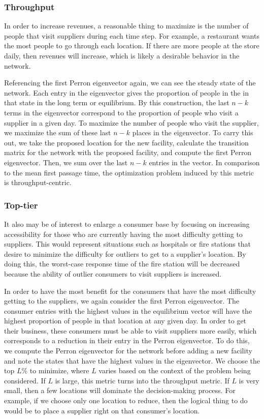 \documentclass[twoside,twocolumn]{article}
\begin{document}
\subsubsection{Throughput}

In order to increase revenues, a reasonable thing to maximize is the number of people that visit suppliers during each time step.
For example, a restaurant wants the most people to go through each location.
If there are more people at the store daily, then revenues will increase, which is likely a desirable behavior in the network.

Referencing the first Perron eigenvector again, we can see the steady state of the network. 
Each entry in the eigenvector gives the proportion of people in the in that state in the long term or equilibrium. 
By this construction, the last $n - k$ terms in the eigenvector correspond to the proportion of people who visit a supplier in a given day.
To maximize the number of people who visit the supplier, we maximize the sum of these last $n - k$ places in the eigenvector.
To carry this out, we take the proposed location for the new facility, calculate the transition matrix for the network with the proposed facility, and compute the first Perron eigenvector.
Then, we sum over the last $n - k$ entries in the vector.
In comparison to the mean first passage time, the optimization problem induced by this metric is throughput-centric.

\subsubsection{Top-tier}
It also may be of interest to enlarge a consumer base by focusing on increasing accessibility for those who are currently having the most difficulty getting to suppliers.
This would represent situations such as hospitals or fire stations that desire to minimize the difficulty for outliers to get to a supplier's location.
By doing this, the worst-case response time of the fire station will be decreased because the ability of outlier consumers to visit suppliers is increased.

In order to have the most benefit for the consumers that have the most difficulty getting to the suppliers, we again consider the first Perron eigenvector.
The consumer entries with the highest values in the equilibrium vector will have the highest proportion of people in that location at any given day.
In order to get their business, these consumers must be able to visit suppliers more easily, which corresponds to a reduction in their entry in the Perron eigenvector.
To do this, we compute the Perron eigenvector for the network before adding a new facility and note the states that have the highest values in the eigenvector.
We choose the top $L$\% to minimize, where $L$ varies based on the context of the problem being considered.
If $L$ is large, this metric turns into the throughput metric.
If $L$ is very small, then a few locations will dominate the decision-making process.
For example, if we choose only one location to reduce, then the logical thing to do would be to place a supplier right on that consumer's location.
\end{document}
